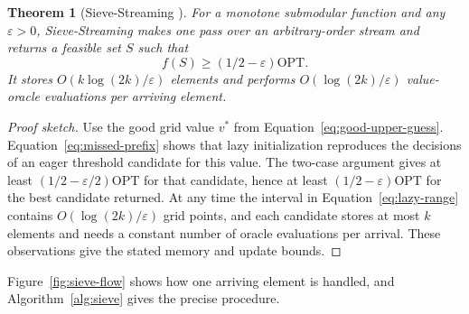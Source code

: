 \documentclass[10pt]{article}
\newtheorem{theorem}{Theorem}
\newcommand{\OPT}{\mathrm{OPT}}
\begin{document}
\begin{theorem}[Sieve-Streaming \cite{badanidiyuru2014streaming}]
For a monotone submodular function and any $\varepsilon>0$, Sieve-Streaming makes one pass over an arbitrary-order stream and returns a feasible set $S$ such that
\begin{equation*}
  f(S)\geq(1/2-\varepsilon)\OPT.
\end{equation*}
It stores $O(k\log(2k)/\varepsilon)$ elements and performs $O(\log(2k)/\varepsilon)$ value-oracle evaluations per arriving element.
\end{theorem}

\begin{proof}[Proof sketch]
Use the good grid value $v^*$ from Equation~\eqref{eq:good-upper-guess}. Equation~\eqref{eq:missed-prefix} shows that lazy initialization reproduces the decisions of an eager threshold candidate for this value. The two-case argument gives at least $(1/2-\varepsilon/2)\OPT$ for that candidate, hence at least $(1/2-\varepsilon)\OPT$ for the best candidate returned. At any time the interval in Equation~\eqref{eq:lazy-range} contains $O(\log(2k)/\varepsilon)$ grid points, and each candidate stores at most $k$ elements and needs a constant number of oracle evaluations per arrival. These observations give the stated memory and update bounds.
\end{proof}

Figure~\ref{fig:sieve-flow} shows how one arriving element is handled, and Algorithm~\ref{alg:sieve} gives the precise procedure.
\end{document}
